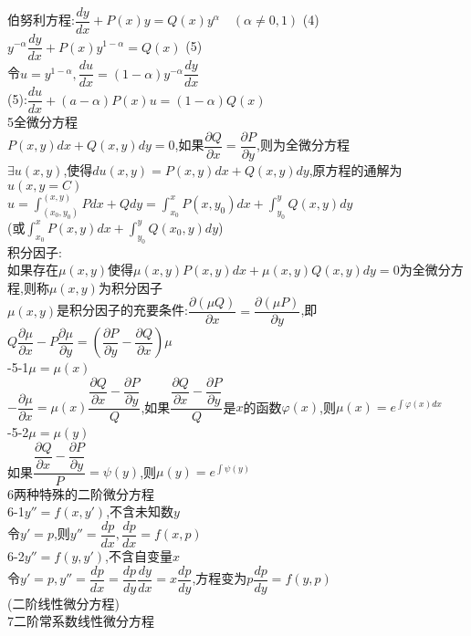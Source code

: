 \documentclass[11pt, a4paper, UTF8]{ctexart}
\begin{document}
伯努利方程:$ \dfrac{dy}{dx}+P(x)y=Q(x)y^{\alpha}\quad (\alpha\not=0,1) $ (4)\\
$ y^{-\alpha}\dfrac{dy}{dx}+P(x)y^{1-\alpha}=Q(x) $ (5)\\
令$ u=y^{1-\alpha},\dfrac{du}{dx}=(1-\alpha)y^{-\alpha}\dfrac{dy}{dx} $\\
(5):$ \dfrac{du}{dx}+(a-\alpha)P(x)u=(1-\alpha)Q(x) $\\
5全微分方程\\
$ P(x,y)dx+Q(x,y)dy=0 $,如果$ \dfrac{\partial Q}{\partial x}=\dfrac{\partial P}{\partial y} $,则为全微分方程\\
$ \exists u(x,y) $,使得$ du(x,y)=P(x,y)dx+Q(x,y)dy $,原方程的通解为$ u(x,y=C) $\\
$ u=\int_{(x_0,y_0)}^{(x,y)}Pdx+Qdy=\int_{x_0}^{x}P(x,y_0)dx+\int_{y_0}^{y}Q(x,y)dy $\\
(或$ \int_{x_0}^{x}P(x,y)dx+\int_{y_0}^{y}Q(x_0,y)dy $)\\
积分因子:\\
如果存在$ \mu(x,y) $使得$ \mu(x,y)P(x,y)dx+\mu(x,y)Q(x,y)dy=0 $为全微分方程,则称$ \mu(x,y) $为积分因子\\
$ \mu(x,y) $是积分因子的充要条件:$ \dfrac{\partial(\mu Q)}{\partial x}=\dfrac{\partial(\mu P)}{\partial y} $,即$ Q\dfrac{\partial\mu}{\partial x}-P\dfrac{\partial\mu}{\partial y}=(\dfrac{\partial P}{\partial y}-\dfrac{\partial Q}{\partial x})\mu $\\
-5-1$ \mu=\mu(x) $\\
$ -\dfrac{\partial\mu}{\partial x}=\mu(x)\dfrac{\dfrac{\partial Q}{\partial x}-\dfrac{\partial P}{\partial y}}{Q} $,如果$ \dfrac{\dfrac{\partial Q}{\partial x}-\dfrac{\partial P}{\partial y}}{Q} $是$ x $的函数$ \varphi(x) $,则$ \mu(x)=e^{\int\varphi(x)dx} $\\
-5-2$ \mu=\mu(y) $\\
如果$ \dfrac{\dfrac{\partial Q}{\partial x}-\dfrac{\partial P}{\partial y}}{P}=\psi(y) $,则$ \mu(y)=e^{\int\psi(y)} $\\
6两种特殊的二阶微分方程\\
6-1$ y''=f(x,y') $,不含未知数$ y $\\
令$ y'=p $,则$ y''=\dfrac{dp}{dx},\dfrac{dp}{dx}=f(x,p) $\\
6-2$ y''=f(y,y') $,不含自变量$ x $\\
令$ y'=p,y''=\dfrac{dp}{dx}=\dfrac{dp}{dy}\dfrac{dy}{dx}=x\dfrac{dp}{dy} $,方程变为$ p\dfrac{dp}{dy}=f(y,p) $\\
(二阶线性微分方程)\\
7二阶常系数线性微分方程\\
\end{document}
